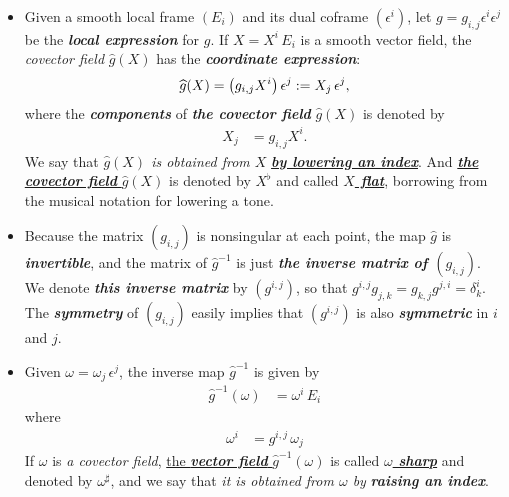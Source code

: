 \documentclass[11pt]{article}
\begin{document}
\begin{itemize}
\item \begin{definition}
Given a smooth local frame $(E_i)$ and its dual coframe $(\epsilon^i)$, let $g = g_{i,j}\epsilon^i \epsilon^j$ be the \emph{\textbf{local expression}} for $g$. If $X= X^i\,E_i$ is a smooth vector field, the \emph{covector field} $\widehat{g}(X)$ has the \emph{\textbf{coordinate expression}}:
\begin{align*}
\widehat{g}(X) = \left(g_{i,j}X^i\right) \epsilon^j := X_j\,\epsilon^j,
\end{align*} where the \emph{\textbf{components}} of \emph{\textbf{the covector field}} $\widehat{g}(X)$ is denoted by 
\begin{align}
X_j &= g_{i,j}X^i. \label{eqn: rieman_lower_index}
\end{align} We say that \emph{$\widehat{g}(X)$ is obtained from $X$} \underline{\emph{\textbf{by lowering an index}}}. And \underline{\emph{\textbf{the covector field}} $\widehat{g}(X)$} is denoted by \underline{$X^{\flat}$} and called \underline{\emph{\textbf{$X$ flat}}}, borrowing from the musical notation for lowering a tone.
\end{definition} 

\item \begin{remark}
Because the matrix $(g_{i,j})$ is nonsingular at each point, the map $\widehat{g}$ is \textit{\textbf{invertible}}, and the matrix of $\widehat{g}^{-1}$ is just \emph{\textbf{the inverse matrix of $(g_{i,j})$}}. We denote \emph{\textbf{this inverse matrix}} by $(g^{i,j})$, so that $g^{i,j} g_{j,k} = g_{k,j} g^{j,i} = \delta_{k}^{i}$. The \emph{\textbf{symmetry}} of $(g_{i,j})$ easily implies that $(g^{i,j})$ is also \emph{\textbf{symmetric}} in $i$ and $j$. 
\end{remark}

\item \begin{definition}
Given $\omega = \omega_j\,\epsilon^{j}$, the inverse map $\widehat{g}^{-1}$ is given by
\begin{align*}
\widehat{g}^{-1}(\omega) &= \omega^i\,E_i
\end{align*}
where
\begin{align}
\omega^{i} &= g^{i,j}\,\omega_{j} \label{eqn: rieman_raising_index}
\end{align} If $\omega$ is \emph{a covector field}, \underline{the \emph{\textbf{vector field}} $\widehat{g}^{-1}(\omega)$} is called \underline{\emph{\textbf{$\omega$ sharp}}} and denoted by \underline{$\omega^{\sharp}$}, and we say that \emph{it is obtained from $\omega$ by} \emph{\textbf{raising an index}}.


\end{definition}
\end{itemize}
\end{document}
